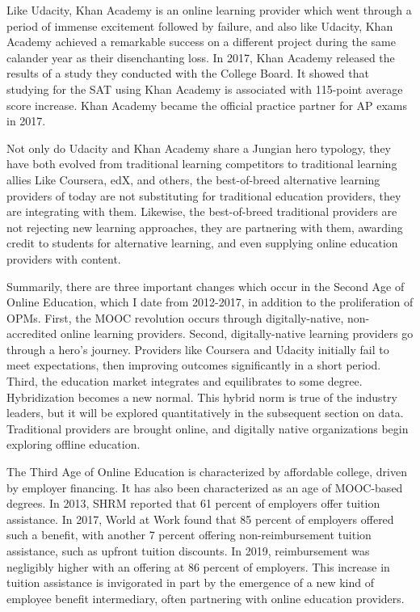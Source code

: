 \documentclass[review]{elsarticle}
\begin{document}
Like Udacity, Khan Academy is an online learning provider which went through a period of immense excitement followed by failure,
and also like Udacity, Khan Academy achieved a remarkable success on a different project during the same calander year as their disenchanting loss.
In 2017, Khan Academy released the results of a study they conducted with the College Board.
It showed that studying for the SAT using Khan Academy is associated with 115-point average score increase\cite{khan_academy_sat_2017}.
Khan Academy became the official practice partner for AP exams in 2017\cite{khan_academy_partner_2017}.

Not only do Udacity and Khan Academy share a Jungian hero typology,
they have both evolved from traditional learning competitors to traditional learning allies
Like Coursera, edX, and others, the best-of-breed alternative learning providers of today are not substituting for traditional education providers,
they are integrating with them. Likewise, the best-of-breed traditional providers are not rejecting new learning approaches,
they are partnering with them, awarding credit to students for alternative learning, and even supplying online education providers with content.

Summarily, there are three important changes which occur in the Second Age of Online Education, which I date from 2012-2017, in addition to the proliferation of OPMs.
First, the MOOC revolution occurs through digitally-native, non-accredited online learning providers.
Second, digitally-native learning providers go through a hero's journey.
Providers like Coursera and Udacity initially fail to meet expectations, then improving outcomes significantly in a short period.
Third, the education market integrates and equilibrates to some degree.
Hybridization becomes a new normal.
This hybrid norm is true of the industry leaders, but it will be explored quantitatively in the subsequent section on data.
Traditional providers are brought online, and digitally native organizations begin exploring offline education.

The Third Age of Online Education is characterized by affordable college, driven by employer financing.
It has also been characterized as an age of MOOC-based degrees.
In 2013, SHRM reported that 61 percent of employers offer tuition assistance\cite{cherry2014rejuvenating}.
In 2017, World at Work found that 85 percent of employers offered such a benefit,
with another 7 percent offering non-reimbursement tuition assistance, such as upfront tuition discounts\cite{talentculture_2018}.
In 2019, reimbursement was negligibly higher with an offering at 86 percent of employers\cite{worldatwork_2019}.
This increase in tuition assistance is invigorated in part by the emergence of a new kind of employee benefit intermediary,
often partnering with online education providers.
\end{document}

